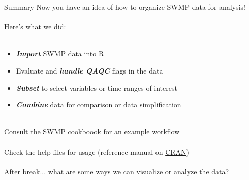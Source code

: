 \documentclass[xcolor=dvipsnames]{beamer}\usepackage[]{graphicx}\usepackage[]{color}
\newcommand{\Bigtxt}[1]{\textbf{\textit{#1}}}
\begin{document}
\begin{frame}[fragile]{Summary}
Now you have an idea of how to organize SWMP data for analysis!\\~\\
Here's what we did: \\~\\
\begin{itemize}
\item \Bigtxt{Import} SWMP data into R
\item Evaluate and \Bigtxt{handle QAQC} flags in the data 
\item \Bigtxt{Subset} to select variables or time ranges of interest 
\item \Bigtxt{Combine} data for comparison or data simplification \\~\\
\end{itemize}
Consult the SWMP cookboook for an example workflow\\~\\
Check the help files for usage (reference manual on \href{https://cran.r-project.org/web/packages/SWMPr/index.html}{CRAN}) \\~\\
After break... what are some ways we can visualize or analyze the data?
\end{frame}

\end{document}
